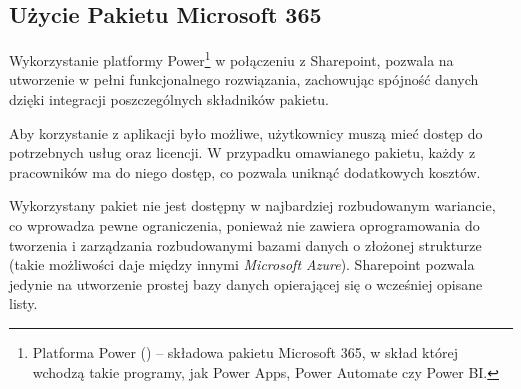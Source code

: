 \subsection{Użycie Pakietu Microsoft 365}

Wykorzystanie platformy Power\footnote{Platforma Power () -- składowa pakietu Microsoft 365, w skład której wchodzą takie programy, jak Power Apps, Power Automate czy Power BI.} w połączeniu z Sharepoint, pozwala na utworzenie w pełni funkcjonalnego rozwiązania, zachowując spójność danych dzięki integracji poszczególnych składników pakietu.

Aby korzystanie z aplikacji było możliwe, użytkownicy muszą mieć dostęp do potrzebnych usług oraz licencji. W przypadku omawianego pakietu, każdy z pracowników ma do niego dostęp, co pozwala uniknąć dodatkowych kosztów.

Wykorzystany pakiet nie jest dostępny w najbardziej rozbudowanym wariancie, co wprowadza pewne ograniczenia, ponieważ nie zawiera oprogramowania do tworzenia i zarządzania rozbudowanymi bazami danych o złożonej strukturze (takie możliwości daje między innymi \emph{Microsoft Azure}).
Sharepoint pozwala jedynie na utworzenie prostej bazy danych opierającej się o wcześniej opisane listy.

